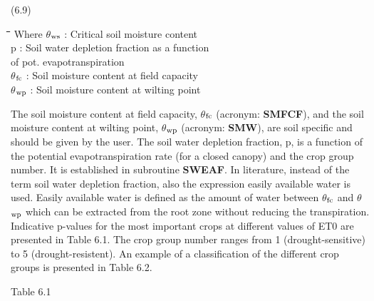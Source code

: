\documentclass[11pt]{article}
\begin{document}
 \bigskip
\strut\hfill (6.9)
\nwln
\begin{tabbing}
\hspace{1.27cm}\=\hspace{1.27cm}\=\hspace{1.27cm}\=\hspace{1.27cm}\=%
\hspace{1.27cm}\=\hspace{1.27cm}\=\hspace{1.27cm}\=\hspace{1.27cm}\=%
\hspace{1.27cm}\=\hspace{1.27cm}\=\kill
Where\> \> $\theta$$_{{\rm ws}}$\> : Critical soil moisture content\> \> \> \> \> \> \> [cm$^{{\rm 3}}$ cm$^{{\rm -3}}$]\\
\>\> p\> : Soil water depletion fraction as a function \\
\>\>   \>   of pot. evapotranspiration\> \> \> \> \> \> \> [cm$^{{\rm 3}}$ cm$^{{\rm -3}}$]\\
\>\> $\theta$$_{{\rm fc}}$\> : Soil moisture content at field capacity\> \> \> \> \> \> \> [cm$^{{\rm 3}}$ cm$^{{\rm -3}}$]\\
\>\> $\theta$$_{{\rm wp}}$\> : Soil moisture content at wilting point\> \> \> \> \> \> \> [cm$^{{\rm 3}}$ cm$^{{\rm -3}}$]
\end{tabbing}

\bigskip
\bigskip
\bigskip
\bigskip
\bigskip
\bigskip
\bigskip
The soil moisture content at field capacity, {\bf $\theta$$_{{\rm fc}}$} (acronym: {\bf SMFCF}), and the soil moisture
content at wilting point, {\bf $\theta$$_{{\rm wp}}$} (acronym: {\bf SMW}), are soil specific and should be given by
the user. The soil water depletion fraction, p, is a function of the potential evapotranspir\-ation rate (for a closed canopy) and the crop group number. It is established in subroutine
{\bf SWEAF}. In literature, instead of the term soil water depletion fraction, also the expres\-sion easily available water is used. Easily available water is defined as the amount of
water between $\theta$$_{{\rm fc}}$ and $\theta$$_{{\rm wp}}$ which can be extracted from the root zone without reducing the
transpiration. Indicative p-values for the most important crops at different values of ET0
are presented in Table 6.1. The crop group number ranges from 1 (drought-sensitive) to 5
(drought-resistent). An example of a classification of the different crop groups is
presented in Table 6.2.

\bigskip
Table 6.1
\testlastline
\end{document}
